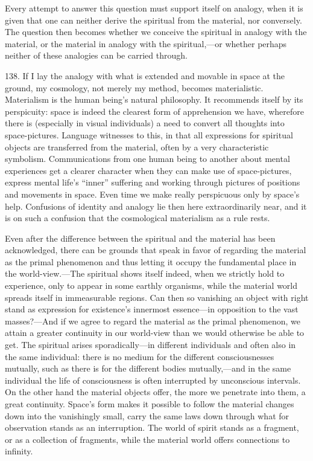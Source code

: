 \documentclass[12pt,a4paper]{book}
\newcommand{\opage}[1]{\marginnote{\footnotesize\textit{[#1]}}}
\begin{document}
Every attempt to answer this question must support itself on analogy, when it is given that one
can neither derive the spiritual from the material, nor conversely. The question then becomes
whether we conceive the spiritual in analogy with the material, or the material in analogy with
the spiritual,---or whether perhaps neither of these analogies can be carried through.

138. If I lay the analogy with what is extended and movable in space at the ground, my
cosmology, not merely my method, becomes materialistic. Materialism is the human being's natural
philosophy. It recommends itself by its perspicuity: space is indeed the clearest form of
apprehension we have, wherefore there is (especially in visual individuals) a need to convert all
thoughts into space-pictures. Language witnesses to this, in that all expressions for spiritual
objects are transferred from the material, often by a very characteristic symbolism.
Communications from one human being to another about mental experiences get a clearer character
when they can make use of space-pictures, express mental life's ``inner'' suffering and working
through pictures of positions and movements in space. Even time we make really perspicuous only by space's help. Confusions of identity and analogy lie then here extraordinarily near, and it is on
such a confusion that the cosmological materialism as a rule rests.

Even after the difference between the spiritual and the material has been acknowledged, there can
be grounds that speak \opage{331}in favor of regarding the material as the primal phenomenon and thus
letting it occupy the fundamental place in the world-view.---The spiritual shows itself indeed,
when we strictly hold to experience, only to appear in some earthly organisms, while the material
world spreads itself in immeasurable regions. Can then so vanishing an object with right stand as
expression for existence's innermost essence---in opposition to the vast masses?---And if we agree
to regard the material as the primal phenomenon, we attain a greater continuity in our world-view
than we would otherwise be able to get. The spiritual arises sporadically---in different
individuals and often also in the same individual: there is no medium for the different
consciousnesses mutually, such as there is for the different bodies mutually,---and in the same
individual the life of consciousness is often interrupted by unconscious intervals. On the other
hand the material objects offer, the more we penetrate into them, a great continuity. Space's form
makes it possible to follow the material changes down into the vanishingly small, carry the same
laws down through what for observation stands as an interruption. The world of spirit stands as a
fragment, or as a collection of fragments, while the material world offers connections to infinity.
\end{document}
